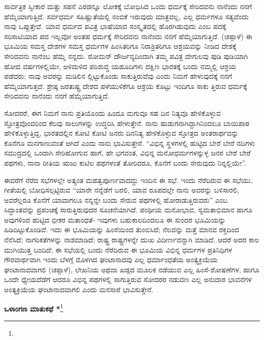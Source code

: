 ಸಾರ್ವತ್ರಿಕ ಸ್ವೀಕಾರ ಮತ್ತು ಸಹನೆ ಎರಡನ್ನೂ ಲೋಕಕ್ಕೆ ಬೋಧಿಸಿದ ಒಂದು ಧರ್ಮಕ್ಕೆ ಸೇರಿದವನು ನಾನೆಂದು ನನಗೆ ಹೆಮ್ಮೆಯಾಗುತ್ತಿದೆ. ಸರ್ವಧರ್ಮ ಸಹಿಷ್ಣುತೆಯಲ್ಲಿ ನಂಬಿಕೆ ಇರುವುದು ಮಾತ್ರವಲ್ಲ, ಎಲ್ಲ ಧರ್ಮಗಳೂ ಸತ್ಯವೆಂದು ನಾವು ಒಪ್ಪುತ್ತೇವೆ. ಯಾವ ಧರ್ಮದ ಪವಿತ್ರ ಭಾಷೆಯಾದ ಸಂಸ್ಕೃತದಲ್ಲಿ ಹೊರಗಿಡುವುದು ಎಂಬ ಪದಕ್ಕೆ ಸರಿಸಾಟಿಯಾದ ಪದ ಇಲ್ಲವೋ ಅಂತಹ ಧರ್ಮಕ್ಕೆ ಸೇರಿದವನು ನಾನೆಂದು ನನಗೆ ಹೆಮ್ಮೆಯಾಗುತ್ತಿದೆ. (ಚಪ್ಪಾಳೆ) ಈ ಭೂಮಿಯ ಸಮಸ್ತ ದೇಶಗಳ ಸಮಸ್ತ ಧರ್ಮಗಳ ಹಿಂಸಿತರಿಗೂ ನಿರಾಶ್ರಿತರಿಗೂ ಆಶ್ರಯವನ್ನು ನೀಡಿದ ದೇಶಕ್ಕೆ ಸೇರಿದವನು ನಾನೆಂಬ ಹೆಮ್ಮೆ ನನ್ನದು. ರೋಮನ್ ದೌರ್ಜನ್ಯದಿಂದಾಗಿ ತಮ್ಮ ಪವಿತ್ರ ದೇಗುಲವು ಪುಡಿ ಪುಡಿಯಾಗಿ ಹೋದ ವರ್ಷಗಳಲ್ಲಿಯೇ, ಅಳಿದುಳಿದ ಪರಿಶುದ್ಧ ಯಹೂದಿಗಳು ದಕ್ಷಿಣ ಭಾರತಕ್ಕೆ ಬಂದು ನಮ್ಮಲ್ಲಿ ಆಶ್ರಯ ಪಡೆದರು; ನಾವು ಅವರನ್ನು ಮಡಿಲಿನ ಲ್ಲಿಟ್ಟುಕೊಂಡು ಸಾಕುತ್ತಿರುವೆವು ಎಂದು ನಿಮಗೆ ಹೇಳುವುದಕ್ಕೆ ನನಗೆ ಹೆಮ್ಮೆಯಾಗುತ್ತದೆ. ಶ್ರೇಷ್ಠ ಜರತುಷ್ಟ್ರ ದೇಶದ ಪಳೆಯುಳಿಕೆಗೂ ಆಶ್ರಯ ಕೊಟ್ಟು ಇಂದಿಗೂ ಸಾಕು ತ್ತಿರುವ ಧರ್ಮಕ್ಕೆ ಸೇರಿದವನು ನಾನೆಂದು ನನಗೆ ಹೆಮ್ಮೆಯಾಗುತ್ತಿದೆ.

ಸೋದರರೆ, ಈಗ ನಿಮಗೆ ನಾನು ಪ್ರತಿಯೊಂದು ಹಿಂದೂ ಮಗುವೂ ಸಹ ದಿನ ನಿತ್ಯವೂ ಹೇಳಿಕೊಳ್ಳುವ ಸ್ತೋತ್ರವೊಂದರಿಂದ ಕೆಲವು ಸಾಲುಗಳನ್ನು ಉದ್ಧರಿಸಿ ಹೇಳುತ್ತೇನೆ. ನಾನು ಹುಡುಗನಾಗಿದ್ದಾಗಿನಿಂದಲೂ ಬಾಯಿಪಾಠ ಹೇಳಿಕೊಳ್ಳುತ್ತಿದ್ದ, ಭಾರತದಲ್ಲಿನ ಕೋಟಿ ಕೋಟಿ ಜನರು ದಿನನಿತ್ಯ ಹೇಳಿಕೊಳ್ಳುವ ಸ್ತೋತ್ರದ ಅಂತರಾರ್ಥವನ್ನು ಕೊನೆಗೂ ಮನಗಾಣುವಂತೆ ಆಗಿದೆ ಎಂದು ನಾನು ಭಾವಿಸುತ್ತೇನೆ. “ವಿಭಿನ್ನ ಸ್ಥಳಗಳಲ್ಲಿ ಹುಟ್ಟಿದ ಬೇರೆ ಬೇರೆ ನದಿಗಳು ಸಮುದ್ರದಲ್ಲಿ ಒಂದಾಗಿ ಸೇರಿಹೋಗುವ ಹಾಗೆ, ಹೇ ಭಗವಂತ, ವಿಭಿನ್ನ ಮನೋಧರ್ಮಗಳನ್ನುಳ್ಳ ಜನರ ಬೇರೆ ಬೇರೆ ಪಥಗಳು, ನಾನಾ ರೀತಿಯ ಋಜು ಕುಟಿಲ ಪಥಗಳಂತೆ ತೋರಿದರೂ, ಕೊನೆಗೆ ಬಂದು ಸೇರುವುದು ನಿನ್ನಲ್ಲಿಯೇ”.

ಈವರೆಗೆ ನೆರೆದ ಸಭೆಗಳಲ್ಲೇ ಅತ್ಯಂತ ಮಹತ್ವಪೂರ್ಣವಾದದ್ದು ಇಂದಿನ ಈ ಸಭೆ. ಇಂದು ನೆರೆದಿರುವ ಈ ಸಭೆಯು, ಗೀತೆಯಲ್ಲಿ ಬೋಧಿಸಲ್ಪಟ್ಟಿರುವ “ಯಾರೇ ನನ್ನೆಡೆಗೆ ಬರಲಿ, ಯಾವ ರೂಪದಲ್ಲೇ ನಾನು ಅವರನ್ನು ಬಳಿಸಾರಲಿ, ಅವರೆಲ್ಲರೂ ಕೊನೆಗೆ ಯಾವಾಗಲೂ ನನ್ನನ್ನೇ ಬಂದು ಸೇರುವ ಪಥಗಳಲ್ಲಿ ಹೋರಾಡುತ್ತಿರುವರು” ಎಂಬ ಸಿದ್ಧಾಂತವನ್ನು ಪ್ರಪಂಚಕ್ಕೆ ಸಾರುತ್ತಿರುವುದರ ಸೂಚನೆಯಾಗಿದೆ. ಪಂಥೀಯ ಮನೋಭಾವ, ಸ್ವಮತಾಭಿಮಾನ ಹಾಗೂ ಅವುಗಳಿಂದ ಹುಟ್ಟಿದ ಭೀಕರ ಮತಾಂಧತೆ- ಇವುಗಳು ಬಹುಕಾಲದಿಂದಲೂ ಈ ಸುಂದರ ಭೂಮಿಯನ್ನು ಹಿಡಿದಿಟ್ಟುಕೊಂಡಿವೆ. ಇದು ಈ ಭೂಮಿಯನ್ನು ಹಿಂಸೆಯಿಂದ ತುಂಬಿಸಿದೆ; ನೆಲವನ್ನು ಮತ್ತೆ ಮಾನವ ರಕ್ತದಿಂದ ನೆನೆಸಿದೆ; ನಾಗರಿಕತೆಗಳನ್ನು ನಾಶಮಾಡಿದೆ; ರಾಷ್ಟ್ರ ರಾಷ್ಟ್ರಗಳನ್ನೇ ದುಃಖ ವಿದೀರ್ಣವನ್ನಾಗಿ ಮಾಡಿದೆ. ಆದರೆ ಅದರ ಕಾಲ ಮುಗಿಯುತ್ತ ಬಂದಿದೆ; ಈ ಸಭೆಯಲ್ಲಿ ಬಂದು ನೆರೆದಿರುವ ಈ ಭೂಮಿಯ ವಿಭಿನ್ನ ಧರ್ಮಗಳ ಪ್ರತಿನಿಧಿಗಳ ಗೌರವಾರ್ಥವಾಗಿ ಇಂದು ಬೆಳಗ್ಗೆ ಮೊಳಗಿದ ಘಂಟಾನಾದವು ಎಲ್ಲ ಧರ್ಮಾಂಧತೆಯ ಅಂತ್ಯಕ್ರಿಯೆಯ ಘಂಟಾನಾದವಾಗಲಿ (ಚಪ್ಪಾಳೆ), ಲೇಖನಿಯ ಅಥವಾ ಖಡ್ಗದ ಮೂಲಕ ನಡೆಯುವ ಎಲ್ಲ ಹಿಂಸೆ-ಶೋಷಣೆಗಳ, ಹಾಗೂ ಒಂದೇ ಧ್ಯೇಯದೆಡೆಗೆ ಆದರೂ ವಿಭಿನ್ನ ಪಥಗಳಲ್ಲಿ ಸಾಗುತ್ತಿರುವ ಸೋದರರ ನಡುವಣ ಎಲ್ಲ ಅನುದಾರ ಭಾವನೆಗಳ ಅಂತ್ಯಕ್ರಿಯೆಯ ಘಂಟಾನಾದವಾಗಲಿ ಎಂದು ಮನಸಾರೆ ಭಾವಿಸುತ್ತೇನೆ.

\begin{center}
\textbf{ಒಳಾಂಗಣ ಮಾತುಕಥೆ *}\footnote{}
\end{center}

